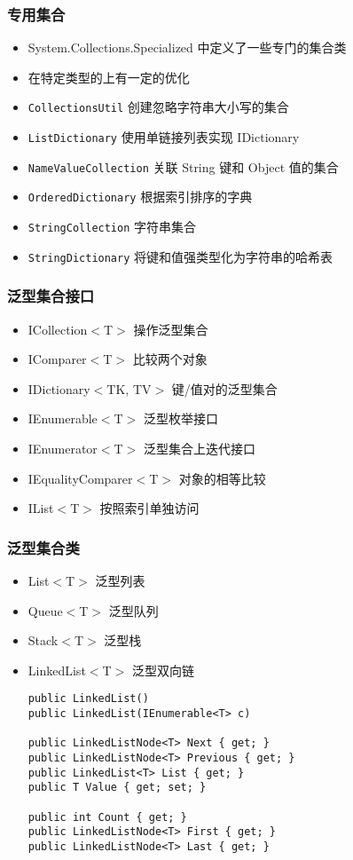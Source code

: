 \begin{frame}
\frametitle{专用集合}
\begin{itemize}
\setlength{\itemsep}{5pt plus 1pt}
\item System.Collections.Specialized 中定义了一些专门的集合类
\item 在特定类型的上有一定的优化
\bigskip
\item \texttt{CollectionsUtil} 创建忽略字符串大小写的集合
\item \texttt{ListDictionary} 使用单链接列表实现 IDictionary
\item \texttt{NameValueCollection} 关联 String 键和 Object 值的集合
\item \texttt{OrderedDictionary} 根据索引排序的字典
\item \texttt{StringCollection} 字符串集合
\item \texttt{StringDictionary} 将键和值强类型化为字符串的哈希表
\end{itemize}
\end{frame}

\begin{frame}
\frametitle{泛型集合接口}
\begin{itemize}
\setlength{\itemsep}{7pt plus 1pt}
\item ICollection$<$T$>$ 操作泛型集合
\item IComparer$<$T$>$ 比较两个对象
\item IDictionary$<$TK, TV$>$ 键/值对的泛型集合
\item IEnumerable$<$T$>$ 泛型枚举接口
\item IEnumerator$<$T$>$ 泛型集合上迭代接口
\item IEqualityComparer$<$T$>$ 对象的相等比较
\item IList$<$T$>$ 按照索引单独访问
\end{itemize}
\end{frame}

\begin{frame}[fragile]
\frametitle{泛型集合类}
\begin{itemize}
\item List$<$T$>$ 泛型列表
\item Queue$<$T$>$ 泛型队列
\item Stack$<$T$>$ 泛型栈
\item LinkedList$<$T$>$ 泛型双向链
\begin{lstlisting}
public LinkedList()
public LinkedList(IEnumerable<T> c)

public LinkedListNode<T> Next { get; }
public LinkedListNode<T> Previous { get; }
public LinkedList<T> List { get; }
public T Value { get; set; }

public int Count { get; }
public LinkedListNode<T> First { get; }
public LinkedListNode<T> Last { get; }
\end{lstlisting}
\end{itemize}
\end{frame}

